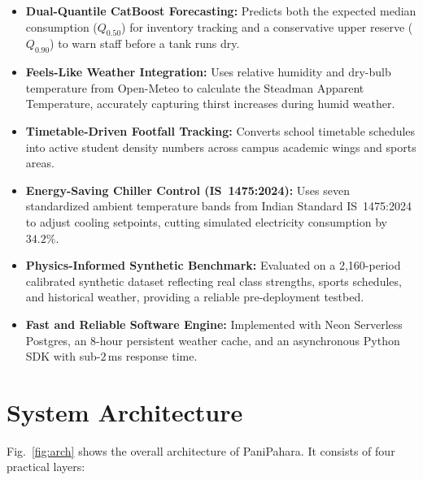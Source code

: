 \documentclass[conference]{IEEEtran}
\begin{document}
\begin{itemize}
    \item \textbf{Dual-Quantile CatBoost Forecasting:} Predicts both the expected median consumption ($Q_{0.50}$) for inventory tracking and a conservative upper reserve ($Q_{0.90}$) to warn staff before a tank runs dry.
    \item \textbf{Feels-Like Weather Integration:} Uses relative humidity and dry-bulb temperature from Open-Meteo to calculate the Steadman Apparent Temperature, accurately capturing thirst increases during humid weather.
    \item \textbf{Timetable-Driven Footfall Tracking:} Converts school timetable schedules into active student density numbers across campus academic wings and sports areas.
    \item \textbf{Energy-Saving Chiller Control (IS~1475:2024):} Uses seven standardized ambient temperature bands from Indian Standard IS~1475:2024 to adjust cooling setpoints, cutting simulated electricity consumption by $34.2\%$.
    \item \textbf{Physics-Informed Synthetic Benchmark:} Evaluated on a 2,160-period calibrated synthetic dataset reflecting real class strengths, sports schedules, and historical weather, providing a reliable pre-deployment testbed.
    \item \textbf{Fast and Reliable Software Engine:} Implemented with Neon Serverless Postgres, an 8-hour persistent weather cache, and an asynchronous Python SDK with sub-$2$\,ms response time.
\end{itemize}

\section{System Architecture}

Fig.~\ref{fig:arch} shows the overall architecture of PaniPahara. It consists of four practical layers:
\end{document}
